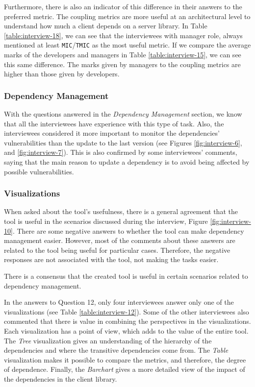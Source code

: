 Furthermore, there is also an indicator of this difference in their answers to the preferred metric. The coupling metrics are more useful at an architectural level to understand how much a client depends on a server library. In Table \ref{table:interview-18}, we can see that the interviewees with manager role, always mentioned at least \texttt{MIC}/\texttt{TMIC} as the most useful metric. If we compare the average marks of the developers and managers in Table \ref{table:interview-15}, we can see this same difference. The marks given by managers to the coupling metrics are higher than those given by developers.

\subsubsection{Dependency Management}
With the questions answered in the \textit{Dependency Management} section, we know that all the interviewees have experience with this type of task. Also, the interviewees considered it more important to monitor the dependencies' vulnerabilities than the update to the last version (see Figures \ref{fig:interview-6}, and \ref{fig:interview-7}). This is also confirmed by some interviewees' comments, saying that the main reason to update a dependency is to avoid being affected by possible vulnerabilities. 

\subsubsection{Visualizations}
When asked about the tool's usefulness, there is a general agreement that the tool is useful in the scenarios discussed during the interview, Figure \ref{fig:interview-10}. There are some negative answers to whether the tool can make dependency management easier. However, most of the comments about these answers are related to the tool being useful for particular cases. Therefore, the negative responses are not associated with the tool, not making the tasks easier.

\begin{finding}
	There is a consensus that the created tool is useful in certain scenarios related to dependency management.
	\label{find:tool-useful}
\end{finding}

In the answers to Question 12, only four interviewees answer only one of the visualizations (see Table \ref{table:interview-12}). Some of the other interviewees also commented that there is value in combining the perspectives in the visualizations. Each visualization has a point of view, which adds to the value of the entire tool. The \textit{Tree} visualization gives an understanding of the hierarchy of the dependencies and where the transitive dependencies come from. The \textit{Table} visualization makes it possible to compare the metrics, and therefore, the degree of dependence. Finally, the \textit{Barchart} gives a more detailed view of the impact of the dependencies in the client library.

